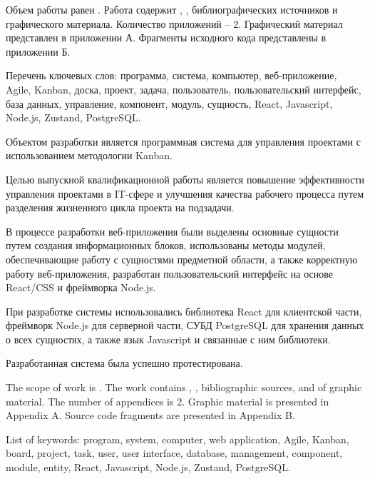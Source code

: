 
Объем работы равен . Работа содержит , ,  библиографических источников и  графического материала. Количество приложений – 2. Графический материал представлен в приложении А. Фрагменты исходного кода представлены в приложении Б.

Перечень ключевых слов: программа, система, компьютер, веб-приложение, Agile, Kanban, доска, проект, задача, пользователь, пользовательский интерфейс, база данных, управление, компонент, модуль, сущность, React, Javascript, Node.js, Zustand, PostgreSQL.

Объектом разработки является программная система для управления проектами с использованием методологии Kanban.

Целью выпускной квалификационной работы является повышение эффективности управления проектами в IT-сфере и улучшения качества рабочего процесса путем разделения жизненного цикла проекта на подзадачи.

В процессе разработки веб-приложения были выделены основные сущности путем создания информационных блоков, использованы методы модулей, обеспечивающие работу с сущностями предметной области, а также корректную работу веб-приложения, разработан пользовательский интерфейс на основе React/CSS и фреймворка Node.js.

При разработке системы использовались библиотека React для клиентской части, фреймворк Node.js для серверной части, СУБД PostgreSQL для хранения данных о всех сущностях, а также язык Javascript и связанные с ним библиотеки.

Разработанная система была успешно протестирована.


The scope of work is . The work contains , ,  bibliographic sources, and  of graphic material. The number of appendices is 2. Graphic material is presented in Appendix A. Source code fragments are presented in Appendix B.

List of keywords: program, system, computer, web application, Agile, Kanban, board, project, task, user, user interface, database, management, component, module, entity, React, Javascript, Node.js, Zustand, PostgreSQL.

